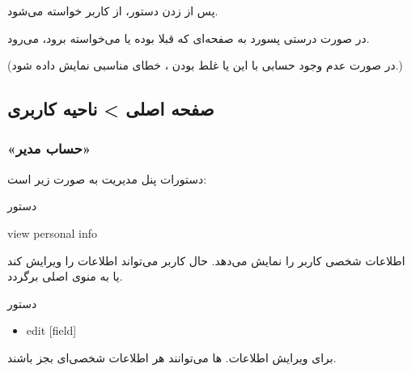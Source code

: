 \documentclass[]{article}
\begin{document}
پس از زدن دستور، از کاربر  خواسته می‌شود.

در صورت درستی پسورد به صفحه‌ای که قبلا بوده یا می‌خواسته برود، می‌رود.

(در صورت عدم وجود حسابی با این  یا غلط بودن ،  خطای مناسبی نمایش داده شود.)

\newpage

\subsection*{{\titr صفحه اصلی > ناحیه کاربری}}

\subsubsection*{{\titr «حساب مدیر»}}


دستورات پنل مدیریت به صورت زیر است:

\begin{mybox}[colback=yellow]{دستور}

\begin{latin}

view personal info

\end{latin}

\end{mybox}

اطلاعات شخصی کاربر را نمایش می‌دهد. حال کاربر می‌تواند اطلاعات را ویرایش کند یا به منوی اصلی برگردد.

\begin{mybox}[colback=yellow]{دستور}


\begin{latin}

\begin{itemize}[label = {$\Rightarrow$}]

\item
edit [field] 

\end{itemize}

\end{latin}

\end{mybox}




برای ویرایش اطلاعات.  ها می‌توانند هر اطلاعات شخصی‌ای بجز  باشند.
\end{document}
